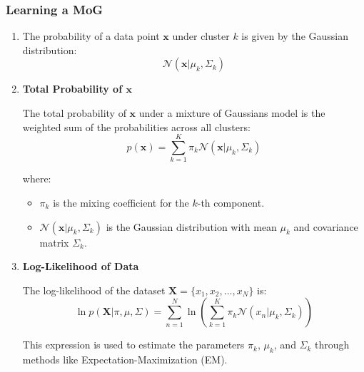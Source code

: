 \subsubsection{Learning a MoG}
\begin{definition}
    \begin{enumerate}
        \item The probability of a data point \( \mathbf{x} \) under cluster \( k \) is given by the Gaussian distribution:
        \[
        \mathcal{N}(\mathbf{x} | \mu_k, \Sigma_k)
        \]
    
        \item \textbf{Total Probability of \( \mathbf{x} \)}
    
        The total probability of \( \mathbf{x} \) under a mixture of Gaussians model is the weighted sum of the probabilities across all clusters:
        \[
        p(\mathbf{x}) = \sum_{k=1}^{K} \pi_k \mathcal{N}(\mathbf{x} | \mu_k, \Sigma_k)
        \]
    
        where:
        \begin{itemize}
            \item \( \pi_k \) is the mixing coefficient for the \( k \)-th component.
            \item \( \mathcal{N}(\mathbf{x} | \mu_k, \Sigma_k) \) is the Gaussian distribution with mean \( \mu_k \) and covariance matrix \( \Sigma_k \).
        \end{itemize}
    
        \item \textbf{Log-Likelihood of Data}
    
        The log-likelihood of the dataset \( \mathbf{X} = \{ x_1, x_2, \dots, x_N \} \) is:
        \[
        \ln p(\mathbf{X} | \pi, \mu, \Sigma) = \sum_{n=1}^{N} \ln \left( \sum_{k=1}^{K} \pi_k \mathcal{N}(x_n | \mu_k, \Sigma_k) \right)
        \]
    
        This expression is used to estimate the parameters \( \pi_k \), \( \mu_k \), and \( \Sigma_k \) through methods like Expectation-Maximization (EM).
    \end{enumerate}
\end{definition}

